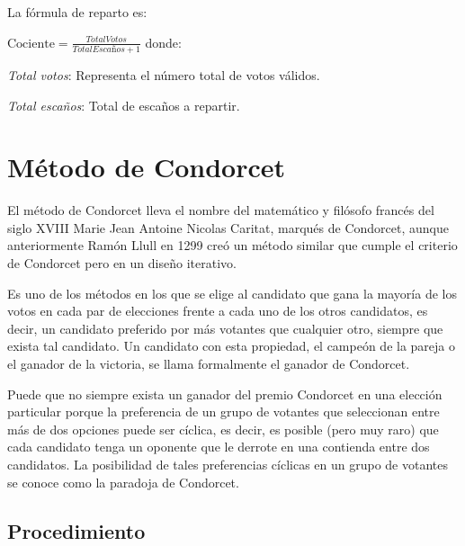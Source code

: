 \documentclass[12pt,a4paper,]{book}
\numberwithin{dummy}{section}
\theoremstyle{ocrenumbox}
\theoremstyle{blacknumex}
\theoremstyle{blacknumbox}
\theoremstyle{ocrenum}
\theoremstyle{ocrenum}
\begin{document}
La fórmula de reparto es:

\(\textrm{Cociente} = \frac{Total Votos}{Total Escaños+1}\) donde:

\emph{Total votos}: Representa el número total de votos válidos.

\emph{Total escaños}: Total de escaños a repartir.

\hypertarget{muxe9todo-de-condorcet}{%
\section{Método de Condorcet}\label{muxe9todo-de-condorcet}}

El método de Condorcet lleva el nombre del matemático y filósofo francés
del siglo XVIII Marie Jean Antoine Nicolas Caritat, marqués de
Condorcet, aunque anteriormente Ramón Llull en 1299 creó un método
similar que cumple el criterio de Condorcet pero en un diseño iterativo.

Es uno de los métodos en los que se elige al candidato que gana la
mayoría de los votos en cada par de elecciones frente a cada uno de los
otros candidatos, es decir, un candidato preferido por más votantes que
cualquier otro, siempre que exista tal candidato. Un candidato con esta
propiedad, el campeón de la pareja o el ganador de la victoria, se llama
formalmente el ganador de Condorcet.

Puede que no siempre exista un ganador del premio Condorcet en una
elección particular porque la preferencia de un grupo de votantes que
seleccionan entre más de dos opciones puede ser cíclica, es decir, es
posible (pero muy raro) que cada candidato tenga un oponente que le
derrote en una contienda entre dos candidatos. La posibilidad de tales
preferencias cíclicas en un grupo de votantes se conoce como la paradoja
de Condorcet.

\hypertarget{procedimiento}{%
\subsection{Procedimiento}\label{procedimiento}}
\end{document}
